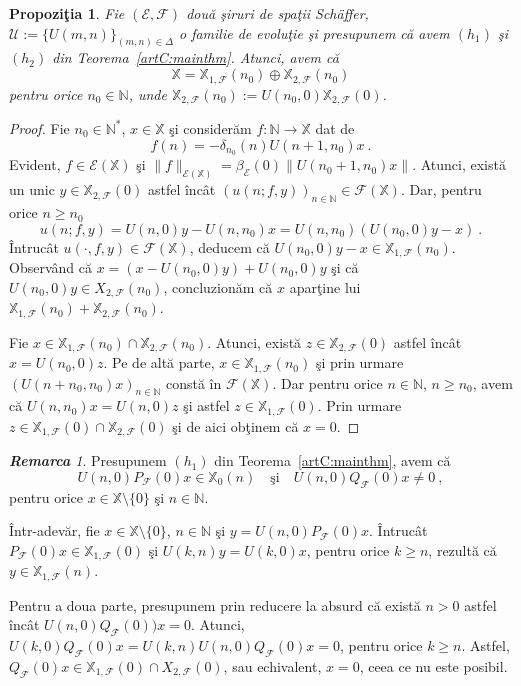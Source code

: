 \documentclass[ a4paper, 12pt]{report}
\newcommand{\E}{\mathcal{E}}
\newcommand{\F}{\mathcal{F}}
\newcommand{\N}{\mathbb{N}}
\newcommand{\X}{\mathbb{X}}
\newtheorem{prop}[theorem]{\bf Propozi\c tia }
\theoremstyle{definition}
\theoremstyle{remark}
\newtheorem{remarc}{\bf Remarca}[section]
\numberwithin{equation}{section}
\begin{document}
\begin{prop}
Fie $(\E,\F)$ dou\u a \c siruri de spa\c tii Sch\"{a}ffer, $\mathcal{U}:=\{U(m,n)\}_{(m,n)\in\Delta}$ o familie de evolu\c tie \c si presupunem c\u a avem  $(h_1)$ \c si  $(h_2)$ din Teorema~\ref{artC:mainthm}. Atunci, avem c\u a
$$\X= \X_{1,\F}(n_0)\oplus \X_{2,\F}(n_0) $$ pentru orice $n_0\in\N$, unde $\X_{2,\F}(n_0):=U(n_0,0)\X_{2,\F}(0)$.
\end{prop}
\begin{proof}
Fie $n_0\in\N^{*}$, $x\in\X$ \c si consider\u am  $f:\N\to\X$ dat de
$$ f(n)=-\delta_{n_0}(n)U(n+1,n_0)x \ .$$
Evident, $f\in\E(\X)$ \c si $\|f\|_{\E(\X)}=\beta_{\E}(0)\|U(n_0+1,n_0)x\|$.
Atunci, exist\u a un unic  $y\in\X_{2,\F}(0)$ astfel \^inc\^at $(u(n;f,y))_{n\in\N}\in\F(\X)$.
Dar, pentru orice $n\geq n_0$
$$u(n;f,y)=U(n,0)y - U(n,n_0)x = U(n,n_0)\left( U(n_0,0)y- x\right)\ .$$
\^Intruc\^at $u(\cdot,f,y)\in\F(\X)$, deducem c\u a $U(n_0,0)y-x \in\X_{1,\F}(n_0)$. Observ\^and c\u a
$x=(x-U(n_0,0)y) + U(n_0,0)y$ \c si c\u a  $U(n_0,0)y\in X_{2,\F}(n_0)$, concluzion\u am c\u a
$x$ apar\c tine lui $\X_{1,\F}(n_0) + \X_{2,\F}(n_0)$.

Fie $x\in \X_{1,\F}(n_0) \cap \X_{2,\F}(n_0)$. Atunci, exist\u a  $z\in \X_{2,\F}(0)$ astfel \^inc\^at $x=U(n_0,0)z$. Pe de alt\u a parte, $x\in \X_{1,\F}(n_0)$ \c si prin urmare $(U(n+n_0,n_0)x)_{n\in\N}$ const\u a \^in $\F(\X)$. Dar pentru orice $n\in\N$, $n\geq n_0$, avem c\u a
$U(n,n_0)x= U(n,0)z$ \c si astfel  $z\in\X_{1,\F}(0)$. Prin urmare $z\in
\X_{1,\F}(0)\cap \X_{2,\F}(0)$ \c si de aici ob\c tinem c\u a $x=0$.

\end{proof}


\begin{remarc}
\label{artC:rem4mainthm}
Presupunem $(h_1)$ din Teorema~\ref{artC:mainthm}, avem c\u a
$$U(n,0)P_{\F}(0)x\in \X_0(n)\quad \mbox{\c si}\quad U(n,0)Q_{\F}(0)x\neq0\ ,$$
pentru orice $x\in\X\setminus\{0\}$ \c si $n\in\N$.

\^Intr-adev\u ar, fie $x\in \X\setminus\{0\}$, $n\in\N$ \c si $y=U(n,0)P_{\F}(0)x$.
\^Intruc\^at $P_{\F}(0)x\in\X_{1,\F}(0)$ \c si $U(k,n)y=U(k,0)x$, pentru orice $k\geq n$, rezult\u a c\u a $y\in \X_{1,\F}(n)$.

Pentru a doua parte, presupunem prin reducere la absurd c\u a exist\u a $n>0$ astfel \^inc\^at $U(n,0)Q_{\F}(0))x=0$. Atunci,
$U(k,0)Q_{\F}(0)x = U(k,n)U(n,0)Q_{\F}(0)x=0$, pentru orice $k\geq n$. Astfel,
$Q_{\F}(0)x\in\X_{1,\F}(0)\cap X_{2,\F}(0)$, sau echivalent, $x=0$, ceea ce nu este posibil.
\end{remarc}
\end{document}

